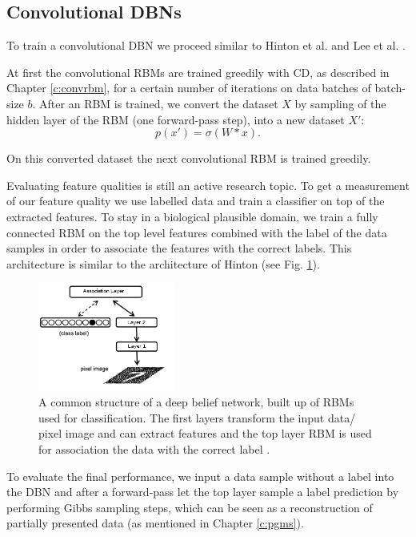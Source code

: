\subsection{Convolutional DBNs} \label{c:convdbns}

To train a convolutional DBN we proceed similar to Hinton et al. and Lee et al. \cite{hinton2006fast}\cite{lee2009convolutional}.

At first the convolutional RBMs are trained greedily with CD, as described in Chapter \ref{c:convrbm}, for a certain number of iterations on data batches of batch-size $b$.
After an RBM is trained, we convert the dataset $X$ by sampling of the hidden layer of the RBM (one forward-pass step), into a new dataset $X'$:
\[
p(x') = \sigma(W * x) .
\]

On this converted dataset the next convolutional RBM is trained greedily.

Evaluating feature qualities is still an active research topic.
To get a measurement of our feature quality we use labelled data and train a classifier on top of the extracted features.
To stay in a biological plausible domain, we train a fully connected RBM on the top level features combined with the label of the data samples in order to associate the features with the correct labels.
This architecture is similar to the architecture of Hinton \cite{hinton2006fast} (see Fig. \ref{fig:dbnmnist}).

\begin{figure}
	\centering
    	\includegraphics[width=0.4\textwidth]{imgs/dbn_mnist.png} 
    \caption[A common structure of a deep belief network.]{A common structure of a deep belief network, built up of RBMs used for classification. The first layers transform the input data/ pixel image and can extract features and the top layer RBM is used for association the data with the correct label \cite{Zorzi2013Modeling}.}
	\label{fig:dbnmnist}
\end{figure}

To evaluate the final performance, we input a data sample without a label into the DBN and after a forward-pass let the top layer sample a label prediction by performing Gibbs sampling steps, which can be seen as a reconstruction of partially presented data (as mentioned in Chapter \ref{c:pgms}).


